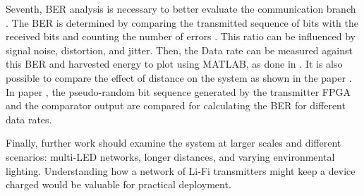 Seventh, \ac{BER} analysis is necessary to better evaluate the communication branch \cite{fan2017circuit}\cite{Shin:16}\cite{de2024reconfigurable}. The \ac{BER} is determined by comparing the transmitted sequence of bits with the received bits and counting the number of errors \cite{fan2017circuit}. This ratio can be influenced by signal noise, distortion, and jitter\cite{ber}. Then, the Data rate can be measured against this \ac{BER} and harvested energy to plot using MATLAB, as done in \cite{liu2016visible}. It is also possible to compare the effect of distance on the system as shown in the paper \cite{liu2016visible}. In paper \cite{fan2017circuit}, the pseudo-random bit sequence generated by the transmitter FPGA and the comparator output are compared for calculating the \ac{BER} for different data rates.

Finally, further work should examine the system at larger scales and different scenarios: multi-LED networks, longer distances, and varying environmental lighting. Understanding how a network of \ac{Li-Fi} transmitters might keep a device charged would be valuable for practical deployment.



